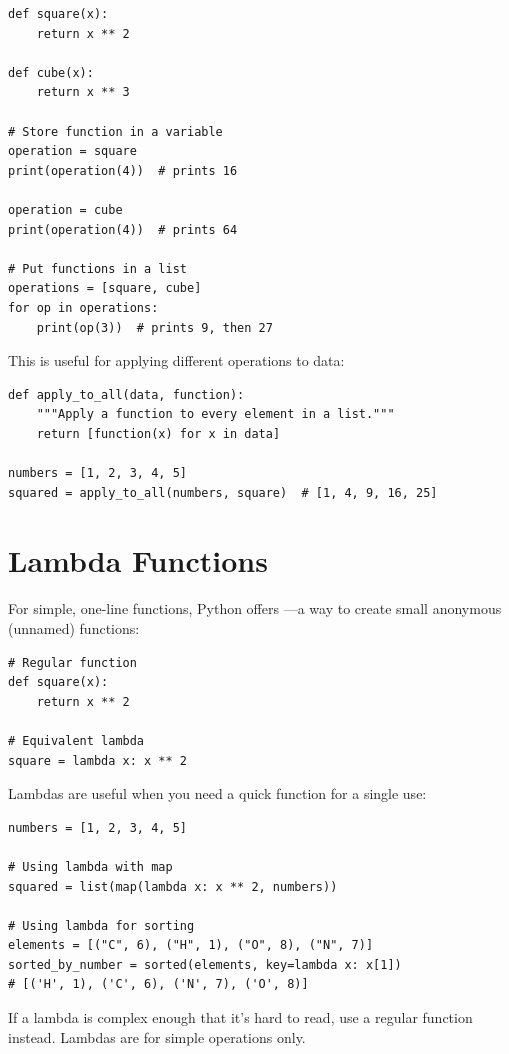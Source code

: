 \begin{lstlisting}
def square(x):
    return x ** 2

def cube(x):
    return x ** 3

# Store function in a variable
operation = square
print(operation(4))  # prints 16

operation = cube
print(operation(4))  # prints 64

# Put functions in a list
operations = [square, cube]
for op in operations:
    print(op(3))  # prints 9, then 27
\end{lstlisting}

This is useful for applying different operations to data:

\begin{lstlisting}
def apply_to_all(data, function):
    """Apply a function to every element in a list."""
    return [function(x) for x in data]

numbers = [1, 2, 3, 4, 5]
squared = apply_to_all(numbers, square)  # [1, 4, 9, 16, 25]
\end{lstlisting}

\section{Lambda Functions}
\label{sec:lambda}

For simple, one-line functions, Python offers ---a way to create small anonymous (unnamed) functions:

\begin{lstlisting}
# Regular function
def square(x):
    return x ** 2

# Equivalent lambda
square = lambda x: x ** 2
\end{lstlisting}

Lambdas are useful when you need a quick function for a single use:

\begin{lstlisting}
numbers = [1, 2, 3, 4, 5]

# Using lambda with map
squared = list(map(lambda x: x ** 2, numbers))

# Using lambda for sorting
elements = [("C", 6), ("H", 1), ("O", 8), ("N", 7)]
sorted_by_number = sorted(elements, key=lambda x: x[1])
# [('H', 1), ('C', 6), ('N', 7), ('O', 8)]
\end{lstlisting}

\begin{tip}
If a lambda is complex enough that it's hard to read, use a regular function instead. Lambdas are for simple operations only.
\end{tip}

